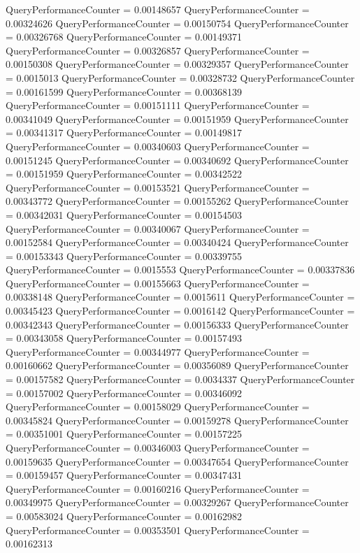 \documentclass[9pt]{article}
\theoremstyle{plain}
\theoremstyle{definition}
\theoremstyle{remark}
\numberwithin{equation}{section}
\begin{document}
QueryPerformanceCounter  =  0.00148657
QueryPerformanceCounter  =  0.00324626
QueryPerformanceCounter  =  0.00150754
QueryPerformanceCounter  =  0.00326768
QueryPerformanceCounter  =  0.00149371
QueryPerformanceCounter  =  0.00326857
QueryPerformanceCounter  =  0.00150308
QueryPerformanceCounter  =  0.00329357
QueryPerformanceCounter  =  0.0015013
QueryPerformanceCounter  =  0.00328732
QueryPerformanceCounter  =  0.00161599
QueryPerformanceCounter  =  0.00368139
QueryPerformanceCounter  =  0.00151111
QueryPerformanceCounter  =  0.00341049
QueryPerformanceCounter  =  0.00151959
QueryPerformanceCounter  =  0.00341317
QueryPerformanceCounter  =  0.00149817
QueryPerformanceCounter  =  0.00340603
QueryPerformanceCounter  =  0.00151245
QueryPerformanceCounter  =  0.00340692
QueryPerformanceCounter  =  0.00151959
QueryPerformanceCounter  =  0.00342522
QueryPerformanceCounter  =  0.00153521
QueryPerformanceCounter  =  0.00343772
QueryPerformanceCounter  =  0.00155262
QueryPerformanceCounter  =  0.00342031
QueryPerformanceCounter  =  0.00154503
QueryPerformanceCounter  =  0.00340067
QueryPerformanceCounter  =  0.00152584
QueryPerformanceCounter  =  0.00340424
QueryPerformanceCounter  =  0.00153343
QueryPerformanceCounter  =  0.00339755
QueryPerformanceCounter  =  0.0015553
QueryPerformanceCounter  =  0.00337836
QueryPerformanceCounter  =  0.00155663
QueryPerformanceCounter  =  0.00338148
QueryPerformanceCounter  =  0.0015611
QueryPerformanceCounter  =  0.00345423
QueryPerformanceCounter  =  0.0016142
QueryPerformanceCounter  =  0.00342343
QueryPerformanceCounter  =  0.00156333
QueryPerformanceCounter  =  0.00343058
QueryPerformanceCounter  =  0.00157493
QueryPerformanceCounter  =  0.00344977
QueryPerformanceCounter  =  0.00160662
QueryPerformanceCounter  =  0.00356089
QueryPerformanceCounter  =  0.00157582
QueryPerformanceCounter  =  0.0034337
QueryPerformanceCounter  =  0.00157002
QueryPerformanceCounter  =  0.00346092
QueryPerformanceCounter  =  0.00158029
QueryPerformanceCounter  =  0.00345824
QueryPerformanceCounter  =  0.00159278
QueryPerformanceCounter  =  0.00351001
QueryPerformanceCounter  =  0.00157225
QueryPerformanceCounter  =  0.00346003
QueryPerformanceCounter  =  0.00159635
QueryPerformanceCounter  =  0.00347654
QueryPerformanceCounter  =  0.00159457
QueryPerformanceCounter  =  0.00347431
QueryPerformanceCounter  =  0.00160216
QueryPerformanceCounter  =  0.00349975
QueryPerformanceCounter  =  0.00329267
QueryPerformanceCounter  =  0.00583024
QueryPerformanceCounter  =  0.00162982
QueryPerformanceCounter  =  0.00353501
QueryPerformanceCounter  =  0.00162313
\end{document}
